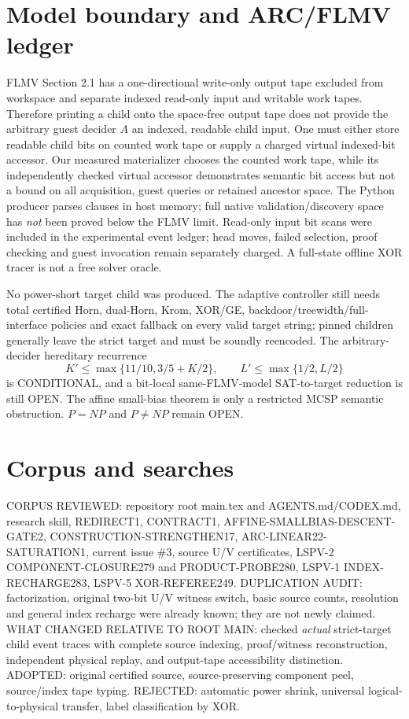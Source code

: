 \documentclass[11pt]{article}
\begin{document}
\section{Model boundary and ARC/FLMV ledger}
FLMV Section 2.1 has a one-directional write-only output tape excluded from workspace and separate indexed read-only input and writable work tapes. Therefore printing a child onto the space-free output tape does not provide the arbitrary guest decider $A$ an indexed, readable child input. One must either store readable child bits on counted work tape or supply a charged virtual indexed-bit accessor. Our measured materializer chooses the counted work tape, while its independently checked virtual accessor demonstrates semantic bit access but not a bound on all acquisition, guest queries or retained ancestor space. The Python producer parses clauses in host memory; full native validation/discovery space has \emph{not} been proved below the FLMV limit. Read-only input bit scans were included in the experimental event ledger; head moves, failed selection, proof checking and guest invocation remain separately charged. A full-state offline XOR tracer is not a free solver oracle.

No power-short target child was produced. The adaptive controller still needs total certified Horn, dual-Horn, Krom, XOR/GE, backdoor/treewidth/full-interface policies and exact fallback on every valid target string; pinned children generally leave the strict target and must be soundly reencoded. The arbitrary-decider hereditary recurrence
\[
 K'\le\max\{11/10,3/5+K/2\},\qquad L'\le\max\{1/2,L/2\}
\]
is CONDITIONAL, and a bit-local same-FLMV-model SAT-to-target reduction is still OPEN. The affine small-bias theorem is only a restricted MCSP semantic obstruction. $P=NP$ and $P\ne NP$ remain OPEN.

\section{Corpus and searches}
CORPUS REVIEWED: repository root main.tex and AGENTS.md/CODEX.md, research skill, REDIRECT1, CONTRACT1, AFFINE-SMALLBIAS-DESCENT-GATE2, CONSTRUCTION-STRENGTHEN17, ARC-LINEAR22-SATURATION1, current issue \#3, source U/V certificates, LSPV-2 COMPONENT-CLOSURE279 and PRODUCT-PROBE280, LSPV-1 INDEX-RECHARGE283, LSPV-5 XOR-REFEREE249. DUPLICATION AUDIT: factorization, original two-bit U/V witness switch, basic source counts, resolution and general index recharge were already known; they are not newly claimed. WHAT CHANGED RELATIVE TO ROOT MAIN: checked \emph{actual} strict-target child event traces with complete source indexing, proof/witness reconstruction, independent physical replay, and output-tape accessibility distinction. ADOPTED: original certified source, source-preserving component peel, source/index tape typing. REJECTED: automatic power shrink, universal logical-to-physical transfer, label classification by XOR.
\end{document}
